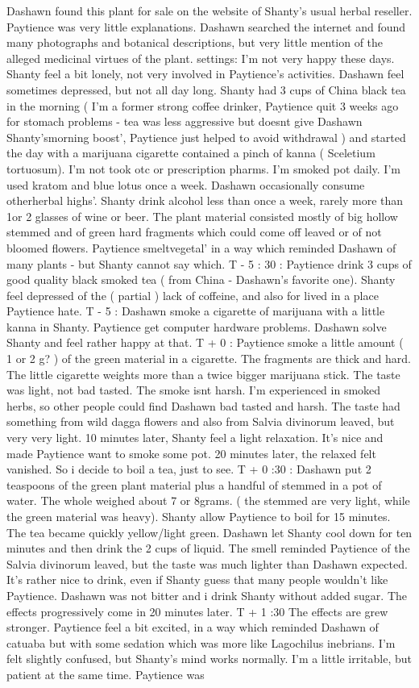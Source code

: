 \documentclass[12pt]{book}
\begin{document}
Dashawn found this plant for sale on the website of Shanty's usual herbal reseller. Paytience was very little explanations. Dashawn searched the internet and found many photographs and botanical descriptions, but very little mention of the alleged medicinal virtues of the plant. settings: I'm not very happy these days. Shanty feel a bit lonely, not very involved in Paytience's activities. Dashawn feel sometimes depressed, but not all day long. Shanty had 3 cups of China black tea in the morning ( I'm a former strong coffee drinker, Paytience quit 3 weeks ago for stomach problems - tea was less aggressive but doesnt give Dashawn Shanty'smorning boost', Paytience just helped to avoid withdrawal ) and started the day with a marijuana cigarette contained a pinch of kanna ( Sceletium tortuosum). I'm not took otc or prescription pharms. I'm smoked pot daily. I'm used kratom and blue lotus once a week. Dashawn occasionally consume otherherbal highs'. Shanty drink alcohol less than once a week, rarely more than 1or 2 glasses of wine or beer. The plant material consisted mostly of big hollow stemmed and of green hard fragments which could come off leaved or of not bloomed flowers. Paytience smeltvegetal' in a way which reminded Dashawn of many plants - but Shanty cannot say which. T - 5 : 30 : Paytience drink 3 cups of good quality black smoked tea ( from China - Dashawn's favorite one). Shanty feel depressed of the ( partial ) lack of coffeine, and also for lived in a place Paytience hate. T - 5 : Dashawn smoke a cigarette of marijuana with a little kanna in Shanty. Paytience get computer hardware problems. Dashawn solve Shanty and feel rather happy at that. T + 0 : Paytience smoke a little amount ( 1 or 2 g? ) of the green material in a cigarette. The fragments are thick and hard. The little cigarette weights more than a twice bigger marijuana stick. The taste was light, not bad tasted. The smoke isnt harsh. I'm experienced in smoked herbs, so other people could find Dashawn bad tasted and harsh. The taste had something from wild dagga flowers and also from Salvia divinorum leaved, but very very light. 10 minutes later, Shanty feel a light relaxation. It's nice and made Paytience want to smoke some pot. 20 minutes later, the relaxed felt vanished. So i decide to boil a tea, just to see. T + 0 :30 : Dashawn put 2 teaspoons of the green plant material plus a handful of stemmed in a pot of water. The whole weighed about 7 or 8grams. ( the stemmed are very light, while the green material was heavy). Shanty allow Paytience to boil for 15 minutes. The tea became quickly yellow/light green. Dashawn let Shanty cool down for ten minutes and then drink the 2 cups of liquid. The smell reminded Paytience of the Salvia divinorum leaved, but the taste was much lighter than Dashawn expected. It's rather nice to drink, even if Shanty guess that many people wouldn't like Paytience. Dashawn was not bitter and i drink Shanty without added sugar. The effects progressively come in 20 minutes later. T + 1 :30 The effects are grew stronger. Paytience feel a bit excited, in a way which reminded Dashawn of catuaba but with some sedation which was more like Lagochilus inebrians. I'm felt slightly confused, but Shanty's mind works normally. I'm a little irritable, but patient at the same time. Paytience was 
\end{document}
